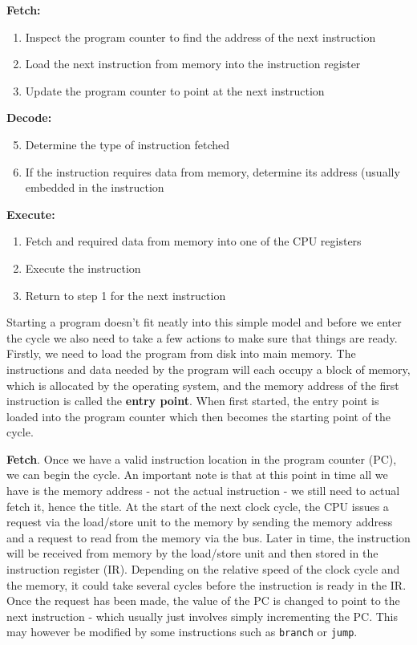 \documentclass{article}
\begin{document}
	\textbf{Fetch:}
	\begin{enumerate}
		\item Inspect the program counter to find the address of the next instruction
		\item Load the next instruction from memory into the instruction register
		\item Update the program counter to point at the next instruction
	\end{enumerate}
	
	\textbf{Decode:}
	\begin{enumerate}
		\setcounter{enumi}{4}
		\item Determine the type of instruction fetched
		\item If the instruction requires data from memory, determine its address (usually embedded in the instruction
	\end{enumerate}
	
	\textbf{Execute:}
	\begin{enumerate}
		\item Fetch and required data from memory into one of the CPU registers
		\item Execute the instruction
		\item Return to step 1 for the next instruction
	\end{enumerate}
	
	Starting a program doesn't fit neatly into this simple model and before we enter the cycle we also need to take a few actions to make sure that things are ready. Firstly, we need to load the program from disk into main memory. The instructions and data needed by the program will each occupy a block of memory, which is allocated by the operating system, and the memory address of the first instruction is called the \textbf{entry point}. When first started, the entry point is loaded into the program counter which then becomes the starting point of the cycle.
	
	\par 
	\textbf{Fetch}. Once we have a valid instruction location in the program counter (PC), we can begin the cycle. An important note is that at this point in time all we have is the memory address - not the actual instruction - we still need to actual fetch it, hence the title. At the start of the next clock cycle, the CPU issues a request via the load/store unit to the memory by sending the memory address and a request to read from the memory via the bus. Later in time, the instruction will be received from memory by the load/store unit and then stored in the instruction register (IR). Depending on the relative speed of the clock cycle and the memory, it could take several cycles before the instruction is ready in the IR. Once the request  has been made, the value of the PC is changed to point to the next instruction - which usually just involves simply incrementing the PC. This may however be modified by some instructions such as \texttt{branch} or \texttt{jump}.
	
\end{document}
